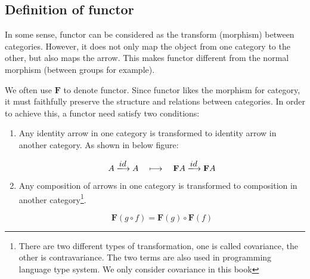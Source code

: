 \documentclass{article}
\begin{document}
\subsection{Definition of functor}
In some sense, functor can be considered as the transform (morphism) between categories. However, it does not only map the object from one category to the other, but also maps the arrow. This makes functor different from the normal morphism (between groups for example).

We often use $\mathbf{F}$ to denote functor. Since functor likes the morphism for category, it must faithfully preserve the structure and relations between categories. In order to achieve this, a functor need satisfy two conditions:

\begin{enumerate}
\item Any identity arrow in one category is transformed to identity arrow in another category. As shown in below figure:

\[
A \arrowto{id} A \quad \longmapsto \quad \mathbf{F}A \arrowto{id} \mathbf{F}A
\]

 
\item Any composition of arrows in one category is transformed to composition in another category\footnote{There are two different types of transformation, one is called covariance, the other is contravariance. The two terms are also used in programming language type system. We only consider covariance in this book}.

\begin{center}
\end{center}

\[
\mathbf{F}(g \circ f) = \mathbf{F}(g) \circ \mathbf{F}(f)
\]
\end{enumerate}
\end{document}
